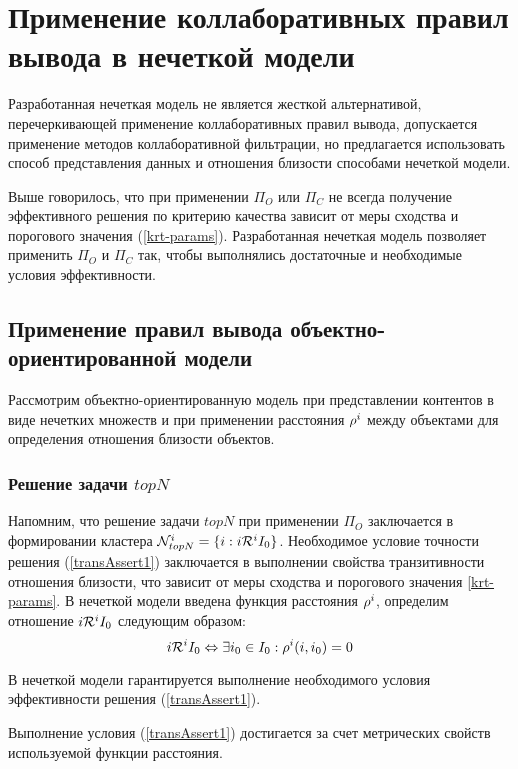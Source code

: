 %
\section{Применение коллаборативных правил вывода в нечеткой модели}
Разработанная нечеткая модель не является жесткой альтернативой,
перечеркивающей применение коллаборативных правил вывода, допускается
применение методов коллаборативной фильтрации, но предлагается использовать
способ представления данных и отношения близости
способами нечеткой модели.

Выше говорилось, что при применении $\Pi_O$ или $\Pi_C$
не всегда
получение эффективного решения по критерию качества
зависит от меры сходства и порогового значения (\ref{krt-params}).
Разработанная нечеткая модель позволяет
применить $\Pi_O$ и $\Pi_C$ так, чтобы выполнялись
достаточные и необходимые условия эффективности.
\subsection{Применение правил вывода объектно-ориентированной модели}
Рассмотрим объектно-ориентированную модель при представлении контентов в виде
нечетких множеств и при применении расстояния ${\mathcal{\rho}}^i$ между объектами для определения
отношения близости объектов.
\subsubsection{Решение задачи $topN$}
Напомним, что решение задачи $topN$
при применении $\Pi_O$ заключается в формировании кластера ${\mathcal{N}^i_{topN}} = \{ i : i \mathcal{R}^i I_0 \}$.
Необходимое условие точности решения (\ref{transAssert1})
заключается в выполнении свойства
транзитивности отношения близости,
что зависит от меры сходства и порогового значения \ref{krt-params}.
В нечеткой модели введена функция расстояния
${\mathcal{\rho}}^i$, определим отношение $i \mathcal{R}^i I_0$ следующим образом:
\begin{equation}
	\label{mod-itopn}
	i \mathcal{R}^i I_0 \Leftrightarrow \exists i_0 \in I_0: {\mathcal{\rho}}^i(i, i_0) = 0
\end{equation}

\begin{trm}
	В нечеткой модели гарантируется выполнение необходимого
	условия эффективности решения (\ref{transAssert1}).
\end{trm}
Выполнение условия (\ref{transAssert1}) достигается за счет метрических свойств
используемой функции расстояния.

